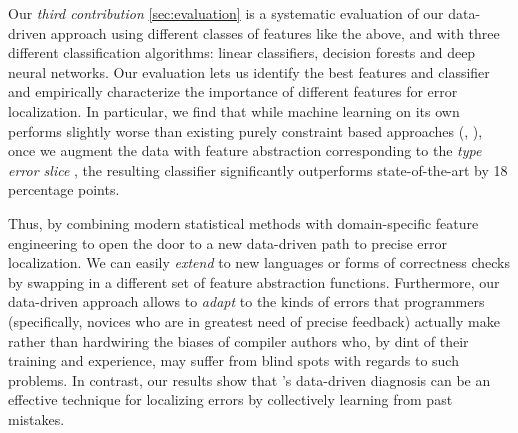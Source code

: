 Our \emph{third contribution} \autoref{sec:evaluation}
is a systematic evaluation of our data-driven approach
using different classes of features like the above, and
with three different classification algorithms: linear
classifiers, decision forests and deep neural networks.
%
Our evaluation lets us identify the best features and
classifier and empirically characterize the importance
of different features for error localization.
%
In particular, we find that while machine learning
on its own performs slightly worse than existing
purely constraint based approaches (\eg \ocaml, \sherrloc),
once we augment the data with feature abstraction
corresponding to the \emph{type error slice} \cite{Tip2001-qp},
the resulting classifier significantly outperforms
state-of-the-art by 18 percentage points.

Thus, by combining modern statistical methods
with domain-specific feature engineering
to open the door to a new data-driven
path to precise error localization.
%
We can easily \emph{extend} \toolname to
new languages or forms of correctness
checks by swapping in a different
set of feature abstraction functions.
%
Furthermore, our data-driven approach
allows \toolname to \emph{adapt} to
the kinds of errors that programmers
(specifically, novices who are in greatest
need of precise feedback) actually make
rather than hardwiring the biases of
compiler authors who, by dint of their
training and experience, may suffer from
blind spots with regards to such problems.
%
In contrast, our results show that \toolname's
data-driven diagnosis can be an effective
technique for localizing errors by collectively
learning from past mistakes.

